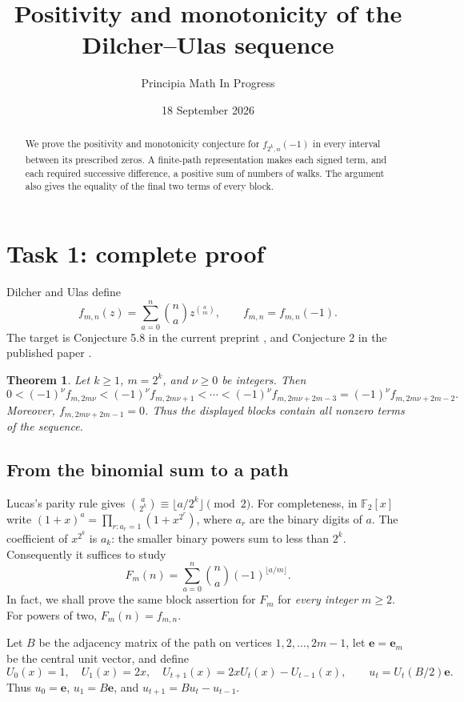\documentclass[11pt]{article}
\title{Positivity and monotonicity of the Dilcher--Ulas sequence}
\author{Principia Math In Progress}
\date{18 September 2026}
\newtheorem{theorem}{Theorem}
\newcommand{\e}{\mathbf e}
\begin{document}
\maketitle
\begin{abstract}
We prove the positivity and monotonicity conjecture for
$f_{2^k,n}(-1)$ in every interval between its prescribed zeros.
A finite-path representation makes each signed term, and each required
successive difference, a positive sum of numbers of walks. The argument
also gives the equality of the final two terms of every block.
\end{abstract}

\section*{Task 1: complete proof}
Dilcher and Ulas define
\[
 f_{m,n}(z)=\sum_{a=0}^n\binom na z^{\binom am},
 \qquad f_{m,n}=f_{m,n}(-1).
\]
The target is Conjecture 5.8 in the current preprint \cite{DUa},
and Conjecture 2 in the published paper \cite{DU}.

\begin{theorem}\label{main}
Let $k\ge1$, $m=2^k$, and $\nu\ge0$ be integers. Then
\[
 0<(-1)^\nu f_{m,2m\nu}<(-1)^\nu f_{m,2m\nu+1}
 <\cdots<(-1)^\nu f_{m,2m\nu+2m-3}
 =(-1)^\nu f_{m,2m\nu+2m-2}.
\]
Moreover, $f_{m,2m\nu+2m-1}=0$. Thus the displayed blocks
contain all nonzero terms of the sequence.
\end{theorem}

\subsection*{From the binomial sum to a path}
Lucas's parity rule gives
$\binom a{2^k}\equiv\lfloor a/2^k\rfloor\pmod2$.
For completeness, in $\mathbb F_2[x]$ write
$(1+x)^a=\prod_{r:a_r=1}(1+x^{2^r})$, where $a_r$ are the
binary digits of $a$. The coefficient of $x^{2^k}$ is $a_k$:
the smaller binary powers sum to less than $2^k$.
Consequently it suffices to study
\begin{equation}\label{F}
 F_m(n)=\sum_{a=0}^n\binom na(-1)^{\lfloor a/m\rfloor}.
\end{equation}
In fact, we shall prove the same block assertion for $F_m$ for
\emph{every integer $m\ge2$}. For powers of two, $F_m(n)=f_{m,n}$.

Let $B$ be the adjacency matrix of the path on vertices
$1,2,\ldots,2m-1$, let $\e=\e_m$ be the central unit vector, and define
\[
 U_0(x)=1,\quad U_1(x)=2x,\quad
 U_{t+1}(x)=2xU_t(x)-U_{t-1}(x),\qquad
 u_t=U_t(B/2)\e.
\]
Thus $u_0=\e$, $u_1=B\e$, and $u_{t+1}=Bu_t-u_{t-1}$.
\end{document}
